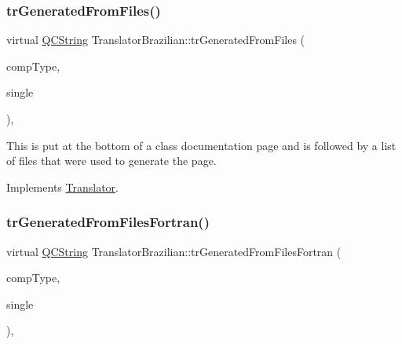 \mbox{\label{class_translator_brazilian_a811e694ccdd2bab8f10760dc2c18ae5f}} 
\subsubsection{\texorpdfstring{trGeneratedFromFiles()}{trGeneratedFromFiles()}}
{\footnotesize\ttfamily virtual \mbox{\hyperlink{class_q_c_string}{Q\+C\+String}} Translator\+Brazilian\+::tr\+Generated\+From\+Files (\begin{DoxyParamCaption}\item[{\mbox{\hyperlink{class_class_def_ae70cf86d35fe954a94c566fbcfc87939}{Class\+Def\+::\+Compound\+Type}}}]{comp\+Type,  }\item[{bool}]{single }\end{DoxyParamCaption})\hspace{0.3cm}{\ttfamily [inline]}, {\ttfamily [virtual]}}

This is put at the bottom of a class documentation page and is followed by a list of files that were used to generate the page. 

Implements \mbox{\hyperlink{class_translator}{Translator}}.

\mbox{\label{class_translator_brazilian_a7730583086a4a9d17cfccae662268717}} 
\subsubsection{\texorpdfstring{trGeneratedFromFilesFortran()}{trGeneratedFromFilesFortran()}}
{\footnotesize\ttfamily virtual \mbox{\hyperlink{class_q_c_string}{Q\+C\+String}} Translator\+Brazilian\+::tr\+Generated\+From\+Files\+Fortran (\begin{DoxyParamCaption}\item[{\mbox{\hyperlink{class_class_def_ae70cf86d35fe954a94c566fbcfc87939}{Class\+Def\+::\+Compound\+Type}}}]{comp\+Type,  }\item[{bool}]{single }\end{DoxyParamCaption})\hspace{0.3cm}{\ttfamily [inline]}, {\ttfamily [virtual]}}

